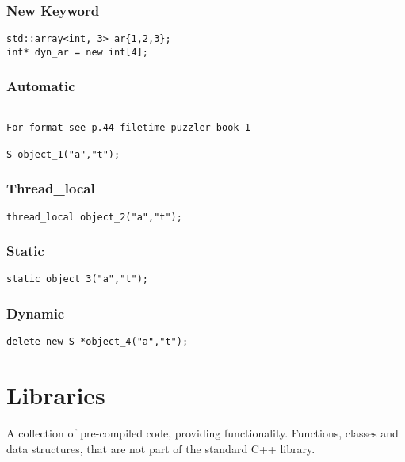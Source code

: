 \subsection{New Keyword}

\begin{verbatim}
std::array<int, 3> ar{1,2,3};
int* dyn_ar = new int[4];
\end{verbatim}



\subsection{Automatic}

\begin{verbatim}

For format see p.44 filetime puzzler book 1

S object_1("a","t");
\end{verbatim}

\subsection{Thread\_local}
\begin{verbatim}
thread_local object_2("a","t");
\end{verbatim}

\subsection{Static}
\begin{verbatim}
static object_3("a","t");
\end{verbatim}

\subsection{Dynamic}

\begin{verbatim}
delete new S *object_4("a","t");
\end{verbatim}

\chapter{Libraries}

A collection of pre-compiled code, providing functionality. Functions, classes and data structures,
that are not part of the standard C++ library.

